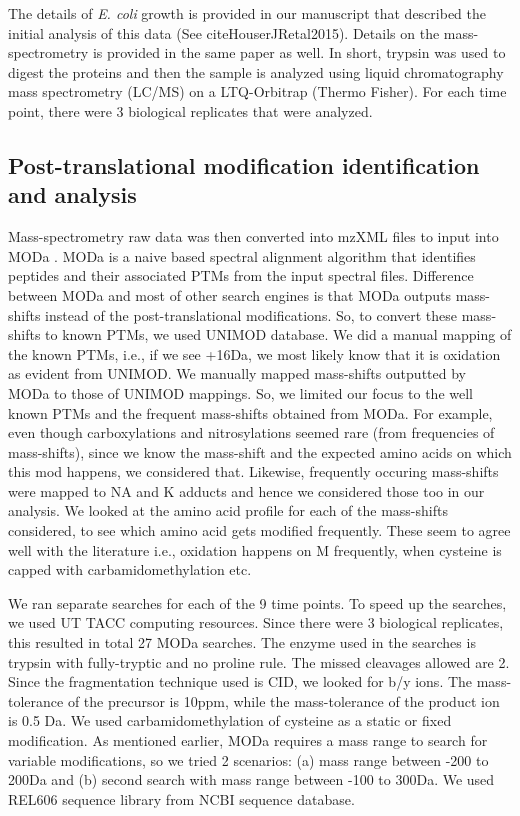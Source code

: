 \documentclass[12pt]{article}
\begin{document}
The details of \emph{E. coli} growth is provided in our manuscript that described the initial analysis of this data (See cite{HouserJRetal2015}). Details on the mass-spectrometry is provided in the same paper as well. In short, trypsin was used to digest the proteins and then the sample is analyzed using liquid chromatography mass spectrometry (LC/MS) on a LTQ-Orbitrap (Thermo Fisher). For each time point, there were 3 biological replicates that were analyzed.

\subsection{Post-translational modification identification and analysis} 

Mass-spectrometry raw data was then converted into mzXML files to input into MODa \cite{Naetal2012}. MODa is a naive based spectral alignment algorithm that identifies peptides and their associated PTMs from the input spectral files. Difference between MODa and most of other search engines is that MODa outputs mass-shifts instead of the post-translational modifications. So, to convert these mass-shifts to known PTMs, we used UNIMOD database. We did a manual mapping of the known PTMs, i.e., if we see +16Da, we most likely know that it is oxidation as evident from UNIMOD. We manually mapped mass-shifts outputted by MODa to those of UNIMOD mappings. So, we limited our focus to the well known PTMs and the frequent mass-shifts obtained from MODa. For example, even though carboxylations and nitrosylations seemed rare (from frequencies of mass-shifts), since we know the mass-shift and the expected amino acids on which this mod happens, we considered that. Likewise, frequently occuring mass-shifts were mapped to NA and K adducts and hence we considered those too in our analysis. We looked at the amino acid profile for each of the mass-shifts considered, to see which amino acid gets modified frequently. These seem to agree well with the literature i.e., oxidation happens on M frequently, when cysteine is capped with carbamidomethylation etc. 

We ran separate searches for each of the 9 time points. To speed up the searches, we used UT TACC computing resources. Since there were 3 biological replicates, this resulted in total 27 MODa searches. The enzyme used in the searches is trypsin with fully-tryptic and no proline rule. The missed cleavages allowed are 2. Since the fragmentation technique used is CID, we looked for b/y ions. The mass-tolerance of the precursor is 10ppm, while the mass-tolerance of the product ion is 0.5 Da. We used carbamidomethylation of cysteine as a static or fixed modification. As mentioned earlier, MODa requires a mass range to search for variable modifications, so we tried 2 scenarios: (a) mass range between -200 to 200Da and (b) second search with mass range between -100 to 300Da. We used REL606 sequence library from NCBI sequence database. 
\end{document}
